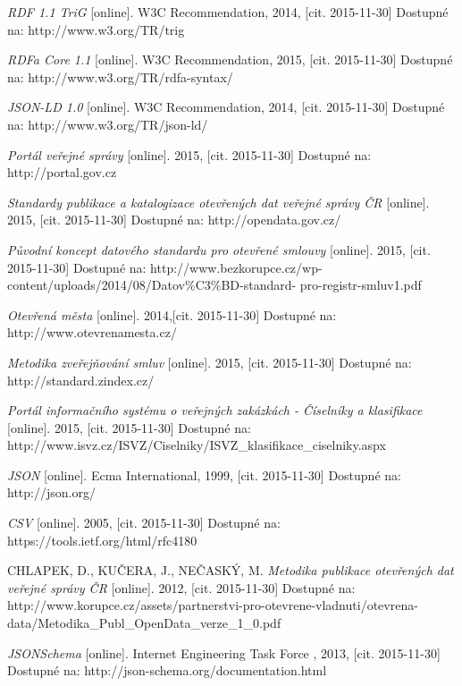 \begin{thebibliography}{99}
  \emph{RDF 1.1 TriG} 
  [online]. W3C Recommendation, 2014, [cit. 2015-11-30] Dostupné na: 
  http://www.w3.org/TR/trig
  
  \emph{RDFa Core 1.1} 
  [online]. W3C Recommendation, 2015, [cit. 2015-11-30] Dostupné na: 
  http://www.w3.org/TR/rdfa-syntax/
  
  \emph{JSON-LD 1.0} 
  [online]. W3C Recommendation, 2014, [cit. 2015-11-30] Dostupné na: 
  http://www.w3.org/TR/json-ld/

  \emph{Portál veřejné správy} 
  [online]. 2015, [cit. 2015-11-30] Dostupné na: 
  http://portal.gov.cz  
    
  \emph{Standardy publikace a katalogizace otevřených dat veřejné správy ČR} 
  [online]. 2015, [cit. 2015-11-30] Dostupné na: 
  http://opendata.gov.cz/  
  
  \emph{Původní koncept datového standardu pro otevřené smlouvy} 
  [online]. 2015, [cit. 2015-11-30] Dostupné na: 
  http://www.bezkorupce.cz/wp-content/uploads/2014/08/Datov\%C3\%BD-standard- pro-registr-smluv1.pdf  
  
  \emph{Otevřená města} 
  [online]. 2014,[cit. 2015-11-30]  Dostupné na: 
  http://www.otevrenamesta.cz/    
  
  \emph{Metodika zveřejňování smluv} 
  [online]. 2015, [cit. 2015-11-30] Dostupné na: 
  http://standard.zindex.cz/

  \emph{Portál informačního systému o veřejných zakázkách - Číselníky a klasifikace} 
  [online]. 2015, [cit. 2015-11-30] Dostupné na: 
  http://www.isvz.cz/ISVZ/Ciselniky/ISVZ\_klasifikace\_ciselniky.aspx  
  
  \emph{JSON} 
  [online]. Ecma International, 1999, [cit. 2015-11-30] Dostupné na: 
  http://json.org/

  \emph{CSV} 
  [online]. 2005, [cit. 2015-11-30] Dostupné na: 
  https://tools.ietf.org/html/rfc4180
  
  CHLAPEK, D., KUČERA, J., NEČASKÝ, M.
  \emph{Metodika publikace otevřených dat veřejné správy ČR } 
  [online]. 2012, [cit. 2015-11-30] Dostupné na: 
  http://www.korupce.cz/assets/partnerstvi-pro-otevrene-vladnuti/otevrena-data/Metodika\_Publ\_OpenData\_verze\_1\_0.pdf
  
  \emph{JSONSchema} 
  [online]. Internet Engineering Task Force , 2013, [cit. 2015-11-30] Dostupné na: 
  http://json-schema.org/documentation.html 
  

\end{thebibliography}
